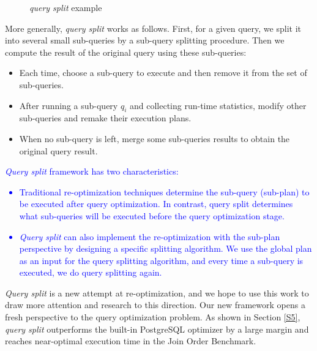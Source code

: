 \begin{figure}[htb]
{\begin{minipage}[t]{0.47\linewidth}
            \end{minipage}
        }
        \centering
        \caption{\textit{query split} example}
        \label{F3}
        \Description{}
    \end{figure}\par
    More generally, \textit{query split} works as follows. First, for a given query, we split it into several small sub-queries by a sub-query splitting procedure. Then we compute the result of the original query using these sub-queries:
    \begin{itemize}[leftmargin = 15pt]
        \item Each time, choose a sub-query to execute and then remove it from the set of sub-queries.
        \item After running a sub-query $q_i$ and collecting run-time statistics, modify other sub-queries and remake their execution plans.
        \item When no sub-query is left, merge some sub-queries results to obtain the original query result.
    \end{itemize}\par
\textcolor{blue}{
    \textit{Query split} framework has two characteristics:
    \begin{itemize}[leftmargin = 15pt]
        \item Traditional re-optimization techniques determine the sub-query (sub-plan) to be executed after query optimization. In contrast, query split determines what sub-queries will be executed before the query optimization stage.
        \item \textit{Query split} can also implement the re-optimization with the sub-plan perspective by designing a specific splitting algorithm. We use the global plan as an input for the query splitting algorithm, and every time a sub-query is executed, we do query splitting again.
    \end{itemize}
}\par
    \textit{Query split} is a new attempt at re-optimization, and we hope to use this work to draw more attention and research to this direction. Our new framework opens a fresh perspective to the query optimization problem. As shown in Section \ref{S5}, \textit{query split} outperforms the built-in PostgreSQL optimizer by a large margin and reaches near-optimal execution time in the Join Order Benchmark.